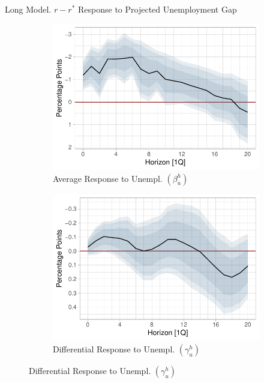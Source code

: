 \documentclass[10pt,aspectratio=169]{beamer}
\begin{document}
\begin{frame}{Long Model. $r-r^*$ Response to Projected Unemployment Gap}

    \begin{figure}[!htbp]\centering
    \begin{minipage}{1\textwidth}
        \caption{}
        \label{fig:LP}
        \begin{subfigure}[b]{0.49\textwidth}
            \centering
            \caption{Average Response to Unempl. $\left(\beta_u^h\right)$}
            \label{fig:average_unemployment}
            \includegraphics[width=\linewidth]{average_unemployment_long.pdf}
        \end{subfigure}
        \hfill
        \begin{subfigure}[b]{0.49\textwidth}
            \centering
            \caption{Differential Response to Unempl. $\left(\gamma_u^h\right)$}
            \label{fig:differential_unemployment}
            \includegraphics[width=\linewidth]{differential_unemployment_long.pdf}

\end{subfigure}
\end{minipage}
\end{figure}
\end{frame}
\end{document}
